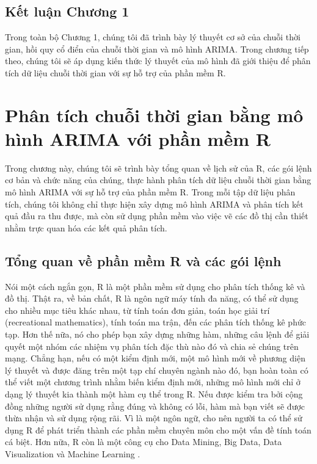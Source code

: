 \documentclass[12pt, a4paper,oneside]{book}
\theoremstyle{definition}
\begin{document}
\section*{Kết luận Chương 1}
Trong toàn bộ Chương 1, chúng tôi đã trình bày lý thuyết cơ sở của chuỗi thời gian, hồi quy cổ điển của chuỗi thời gian và mô hình ARIMA. Trong chương tiếp theo, chúng tôi sẽ áp dụng kiến thức lý thuyết của mô hình đã giới thiệu để phân tích dữ liệu chuỗi thời gian với sự hỗ trợ của phần mềm R.
	
\chapter{Phân tích chuỗi thời gian bằng mô hình ARIMA với phần mềm R}
Trong chương này, chúng tôi sẽ trình bày tổng quan về lịch sử của R, các gói lệnh cơ bản và chức năng của chúng, thực hành phân tích dữ liệu chuỗi thời gian bằng mô hình ARIMA với sự hỗ trợ của phần mềm R. Trong mỗi tập dữ liệu phân tích, chúng tôi không chỉ thực hiện xây dựng mô hình ARIMA và phân tích kết quả đầu ra thu được, mà còn sử dụng phần mềm vào việc vẽ các đồ thị cần thiết nhằm trực quan hóa các kết quả phân tích. 
\section{Tổng quan về phần mềm R và các gói lệnh}
Nói một cách ngắn gọn, R là một phần mềm sử dụng cho phân tích thống kê và đồ thị. Thật ra, về bản chất, R là ngôn ngữ máy tính đa năng, có thể sử dụng cho nhiều mục tiêu khác nhau, từ tính toán đơn giản, toán học giải trí (recreational mathematics), tính toán ma trận, đến các phân tích thống kê phức tạp. Hơn thế nữa, nó cho phép bạn xây dựng những hàm, những câu lệnh để giải quyết một nhóm các nhiệm vụ phân tích đặc thù nào đó và chia sẻ chúng trên mạng. Chẳng hạn, nếu có một kiểm định mới, một mô hình mới về phương diện lý thuyết và được đăng trên một tạp chí chuyên ngành nào đó, bạn hoàn toàn có thể viết một chương trình nhằm biến kiểm định mới, những mô hình mới chỉ ở dạng lý thuyết kia thành một hàm cụ thể trong R. Nếu được kiểm tra bởi cộng đồng những người sử dụng rằng đúng và không có lỗi, hàm mà bạn viết sẽ được thừa nhận và sử dụng rộng rãi. Vì là một ngôn ngữ, cho nên người ta có thể sử dụng R để phát triển thành các phần mềm chuyên môn cho một vấn đề tính toán cá biệt. Hơn nữa, R còn là một công cụ cho Data Mining, Big Data, Data Visualization và Machine Learning \cite{11, 12, 13, 14}.
\end{document}
